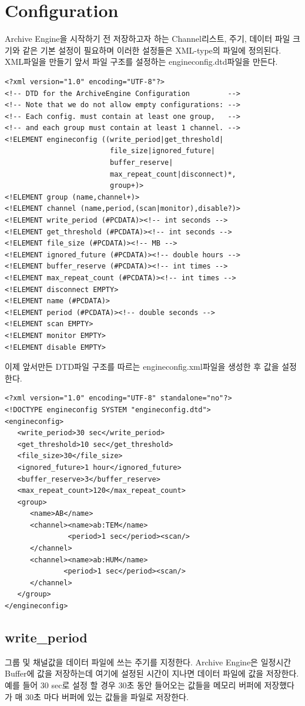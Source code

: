 \documentclass[11pt
  , a4paper
  , article
  , oneside
]{memoir}
\begin{document}
\section{Configuration}
Archive Engine을 시작하기 전 저장하고자 하는 Channel리스트, 주기, 데이터 파일 크기와 같은
기본 설정이 필요하며 이러한 설정들은 XML-type의 파일에 정의된다. XML파일을 만들기 앞서
파일 구조를 설정하는 engineconfig.dtd파일을 만든다.
\begin{lstlisting}[style=termstyle]
<?xml version="1.0" encoding="UTF-8"?>
<!-- DTD for the ArchiveEngine Configuration         -->
<!-- Note that we do not allow empty configurations: -->
<!-- Each config. must contain at least one group,   -->
<!-- and each group must contain at least 1 channel. -->
<!ELEMENT engineconfig ((write_period|get_threshold|
                         file_size|ignored_future|
                         buffer_reserve|
                         max_repeat_count|disconnect)*,
                         group+)>
<!ELEMENT group (name,channel+)>
<!ELEMENT channel (name,period,(scan|monitor),disable?)>
<!ELEMENT write_period (#PCDATA)><!-- int seconds -->
<!ELEMENT get_threshold (#PCDATA)><!-- int seconds -->
<!ELEMENT file_size (#PCDATA)><!-- MB -->
<!ELEMENT ignored_future (#PCDATA)><!-- double hours -->
<!ELEMENT buffer_reserve (#PCDATA)><!-- int times -->
<!ELEMENT max_repeat_count (#PCDATA)><!-- int times -->
<!ELEMENT disconnect EMPTY>
<!ELEMENT name (#PCDATA)>
<!ELEMENT period (#PCDATA)><!-- double seconds -->
<!ELEMENT scan EMPTY>
<!ELEMENT monitor EMPTY>
<!ELEMENT disable EMPTY>
\end{lstlisting} 
이제 앞서만든 DTD파일 구조를 따르는 engineconfig.xml파일을 생성한 후 값을 설정한다.
\begin{lstlisting}[style=termstyle]
<?xml version="1.0" encoding="UTF-8" standalone="no"?>
<!DOCTYPE engineconfig SYSTEM "engineconfig.dtd">
<engineconfig>
   <write_period>30 sec</write_period>
   <get_threshold>10 sec</get_threshold>
   <file_size>30</file_size>
   <ignored_future>1 hour</ignored_future>
   <buffer_reserve>3</buffer_reserve>
   <max_repeat_count>120</max_repeat_count>
   <group>
      <name>AB</name>
      <channel><name>ab:TEM</name>
               <period>1 sec</period><scan/>
      </channel>
      <channel><name>ab:HUM</name>
              <period>1 sec</period><scan/>
      </channel>
   </group>
</engineconfig>
\end{lstlisting}

\subsection{write\_period}
그룹 및 채널값을 데이터 파일에 쓰는 주기를 지정한다. Archive Engine은 일정시간
Buffer에 값을 저장하는데 여기에 설정된 시간이 지나면 데이터 파일에 값을 저장한다.
예를 들어 30 sec로 설정 할 경우 30초 동안 들어오는 값들을 메모리 버퍼에 저장했다가
매 30초 마다 버퍼에 있는 값들을 파일로 저장한다.
\end{document}
